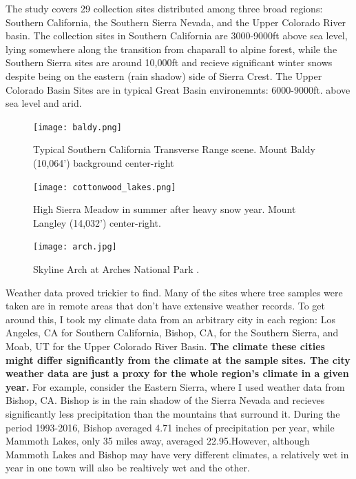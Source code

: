 \documentclass[]{article}
\begin{document}
The study covers 29 collection sites distributed among three broad regions: Southern California, the Southern Sierra Nevada, and the Upper Colorado River basin. The collection sites in Southern California are 3000-9000ft above sea level, lying somewhere along the transition from chaparall to alpine forest, while the Southern Sierra sites are around 10,000ft and recieve significant winter snows despite being on the eastern (rain shadow) side of Sierra Crest. The Upper Colorado Basin Sites are in typical Great Basin environemnts: 6000-9000ft. above sea level and arid. 

\begin{figure}
	\centering
	\texttt{[image: baldy.png]}
	\caption{Typical Southern California Transverse Range scene. Mount Baldy (10,064') background center-right}
	\label{fig:baldy}
\end{figure}

\begin{figure}
	\centering
	\texttt{[image: cottonwood\_lakes.png]}
	\caption{High Sierra Meadow in summer after heavy snow year. Mount Langley (14,032') center-right.}
	\label{fig:cottonwood}
\end{figure}

\begin{figure}
	\centering
	\texttt{[image: arch.jpg]}
	\caption{Skyline Arch at Arches National Park \cite{arch_pic}.}
	\label{fig:arch}
\end{figure}

Weather data proved trickier to find. Many of the sites where tree samples were taken are in remote areas that don't have extensive weather records. To get around this, I took my climate data from an arbitrary city in each region: Los Angeles, CA for Southern California, Bishop, CA, for the Southern Sierra, and Moab, UT for the Upper Colorado River Basin. \textbf{The climate these cities might differ significantly from the climate at the sample sites.  The city weather data are just a proxy for the whole region's climate in a given year.} For example, consider the Eastern Sierra, where I used weather data from Bishop, CA. Bishop is in the rain shadow of the Sierra Nevada and recieves significantly less precipitation than  the mountains that surround it. During the period 1993-2016, Bishop averaged 4.71 inches of precipitation per year,  while Mammoth Lakes, only 35 miles away, averaged 22.95.However, although Mammoth Lakes and Bishop may have very different climates, a relatively wet in year in one town will also be realtively wet and the other. 
\end{document}
